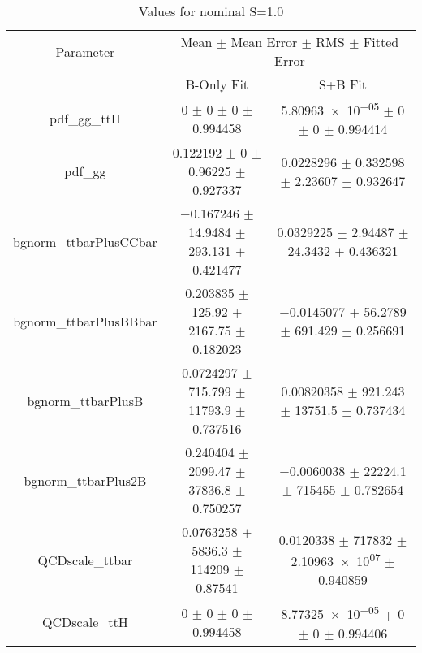 \begin{table}
\centering
\caption{Values for nominal S=1.0}
\begin{tabular}{ccc}
\toprule
Parameter & \multicolumn{2}{c}{Mean $\pm$ Mean Error $\pm$ RMS $\pm$ Fitted Error}\\
 & B-Only Fit & S+B Fit\\
\midrule
pdf\_gg\_ttH & \num{0} $\pm$ \num{0} $\pm$ \num{0} $\pm$ \num{0.994458} & \num{5.80963e-05} $\pm$ \num{0} $\pm$ \num{0} $\pm$ \num{0.994414}\\
pdf\_gg & \num{0.122192} $\pm$ \num{0} $\pm$ \num{0.96225} $\pm$ \num{0.927337} & \num{0.0228296} $\pm$ \num{0.332598} $\pm$ \num{2.23607} $\pm$ \num{0.932647}\\
bgnorm\_ttbarPlusCCbar & \num{-0.167246} $\pm$ \num{14.9484} $\pm$ \num{293.131} $\pm$ \num{0.421477} & \num{0.0329225} $\pm$ \num{2.94487} $\pm$ \num{24.3432} $\pm$ \num{0.436321}\\
bgnorm\_ttbarPlusBBbar & \num{0.203835} $\pm$ \num{125.92} $\pm$ \num{2167.75} $\pm$ \num{0.182023} & \num{-0.0145077} $\pm$ \num{56.2789} $\pm$ \num{691.429} $\pm$ \num{0.256691}\\
bgnorm\_ttbarPlusB & \num{0.0724297} $\pm$ \num{715.799} $\pm$ \num{11793.9} $\pm$ \num{0.737516} & \num{0.00820358} $\pm$ \num{921.243} $\pm$ \num{13751.5} $\pm$ \num{0.737434}\\
bgnorm\_ttbarPlus2B & \num{0.240404} $\pm$ \num{2099.47} $\pm$ \num{37836.8} $\pm$ \num{0.750257} & \num{-0.0060038} $\pm$ \num{22224.1} $\pm$ \num{715455} $\pm$ \num{0.782654}\\
QCDscale\_ttbar & \num{0.0763258} $\pm$ \num{5836.3} $\pm$ \num{114209} $\pm$ \num{0.87541} & \num{0.0120338} $\pm$ \num{717832} $\pm$ \num{2.10963e+07} $\pm$ \num{0.940859}\\
QCDscale\_ttH & \num{0} $\pm$ \num{0} $\pm$ \num{0} $\pm$ \num{0.994458} & \num{8.77325e-05} $\pm$ \num{0} $\pm$ \num{0} $\pm$ \num{0.994406}\\
\bottomrule
\end{tabular}
\end{table}